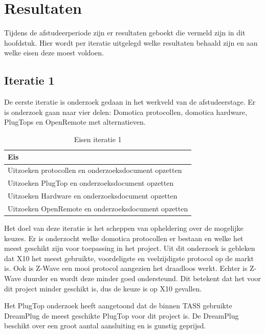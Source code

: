 \documentclass[]{article}
\begin{document}
\newpage
\section{Resultaten}

Tijdens de afstudeerperiode zijn er resultaten geboekt die vermeld zijn in dit
hoofdstuk. Hier wordt per iteratie uitgelegd welke resultaten behaald
zijn en aan welke eisen deze moest voldoen.

\subsection{Iteratie 1}
De eerste iteratie is onderzoek gedaan in het werkveld van de afstudeerstage.
Er is onderzoek gaan naar vier delen: Domotica protocollen, domotica hardware,
PlugTops en OpenRemote met alternatieven. 

\begin{table}[htpb]
  \caption{Eisen iteratie 1}
  \begin{center}
    \begin{tabular}{|| l ||}\hline
        Eis                                                  \\\hline\hline
        Uitzoeken protocollen en onderzoeksdocument opzetten \\\hline
        Uitzoeken PlugTop en onderzoeksdocument opzetten     \\\hline
        Uitzoeken Hardware en onderzoeksdocument opzetten    \\\hline
        Uitzoeken OpenRemote en onderzoeksdocument opzetten  \\\hline
    \end{tabular}
  \end{center}
\end{table}

Het doel van deze iteratie is het scheppen van opheldering over de mogelijke
keuzes. Er is onderzocht welke domotica protocollen er bestaan en welke het
meest geschikt zijn voor toepassing in het project. Uit dit onderzoek is
gebleken dat X10 het meest gebruikte, voordeligste en veelzijdigste protocol op de markt
is. Ook is Z-Wave een mooi protocol aangezien het draadloos werkt. Echter is
Z-Wave duurder en wordt deze minder goed ondersteund. Dit betekent dat het voor dit
project minder geschikt is, dus de keuze is op X10 gevallen.  

Het PlugTop onderzoek heeft aangetoond dat de binnen TASS gebruikte
DreamPlug de meest geschikte PlugTop voor dit project is. De DreamPlug
beschikt over een groot aantal aansluiting en is gunstig geprijsd. 
\end{document}
